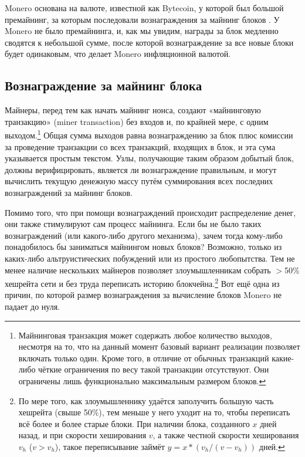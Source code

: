 Monero основана на валюте, известной как Bytecoin, у которой был большой премайнинг, за которым последовали вознаграждения за майнинг блоков \cite{monero-history}. У Monero не было премайнин\-га, и, как мы увидим, награды за блок медленно сводятся к небольшой сумме, после которой вознаграждение за все новые блоки будет одинаковым, что делает Monero инфляционной валютой.


\subsection{Вознаграждение за майнинг блока}
\label{subsec:block-reward} %

Майнеры, перед тем как начать майнинг нонса, создают «майнинговую транзакцию» (miner transaction) без входов и, по крайней мере, с одним выходом.\footnote{Майнинговая транзакция может содержать любое количество выходов, несмотря на то, что на данный момент базовый вариант реализации позволяет включать только один. Кроме того, в отличие от обычных транзакций какие-либо чёткие ограничения по весу такой транзакции отсутствуют. Они ограничены лишь функционально максимальным размером блоков.} Общая сумма выходов равна вознаграждению за блок плюс комиссии за проведение транзакции со всех транзакций, входящих в блок, и эта сума указывается простым текстом. Узлы, получающие таким образом добытый блок, должны верифицировать, является ли вознаграждение правильным, и могут вычислить текущую денежную массу путём суммирования всех последних вознаграждений за майнинг блоков.

Помимо того, что при помощи вознаграждений происходит распределение денег, они также стимулируют сам процесс майнинга. Если бы не было таких вознаграждений (или какого-либо другого механизма), зачем тогда кому-либо понадобилось бы заниматься майнингом новых блоков? Возможно, только из каких-либо альтруистических побуждений или из про\-стого любопытства. Тем не менее наличие нескольких майнеров позволяет злоумышленникам собрать $>$50\% хешрейта сети и без труда переписать историю блокчейна.\footnote{По мере того, как злоумышленнику удаётся заполучить большую часть хешрейта (свыше 50\%), тем меньше у него уходит на то, чтобы переписать всё более и более старые блоки. При наличии блока, созданного $x$ дней назад, и при скорости хеширования $v$, а также честной скорости хеширования $v_h$ ($v > v_h$), такое переписывание займёт $y = x*(v_h/(v-v_h))$ дней.} Вот ещё одна из причин, по которой размер вознаграждения за вычисление блоков Monero не падает до нуля.

